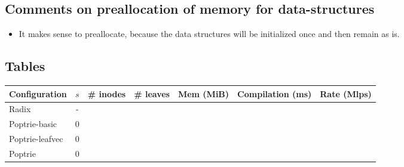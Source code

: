 \documentclass{article}
\begin{document}
\subsection{Comments on preallocation of memory for data-structures}
\begin{itemize}
    \item It makes sense to preallocate, because the data
    structures will be initialized once and then remain as is.
\end{itemize}

\subsection{Tables}
\begin{center}
    \begin{tabular}{|l|c|c|c|c|c|c|}
        \hline
        Configuration   & $s$ & \# inodes & \# leaves & Mem (MiB) & Compilation (ms) & Rate (Mlps) \\ 
        \hline
        Radix           & -   & & & & & \\ 
        \hline                           
        Poptrie-basic   & $0$ & & & & & \\  
        \hline                           
        Poptrie-leafvec & $0$ & & & & & \\
        \hline
        Poptrie         & $0$ & & & & & \\
        \hline
    \end{tabular}
\end{center}
\end{document}
